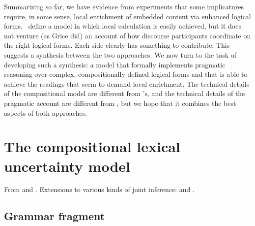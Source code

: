 \documentclass{article}
\begin{document}
Summarizing so far, we have evidence from
 experiments that some implicatures
require, in some sense, local enrichment of embedded content via
enhanced logical forms.  \CFS\ define a model in which local
calculation is easily achieved, but it does not venture (as Grice did)
an account of how discourse participants coordinate on the right
logical forms. Each side clearly has something to contribute.  This
suggests a synthesis between the two approaches. We now turn to the
task of developing such a synthesis: a model that formally implements
pragmatic reasoning over complex, compositionally defined logical
forms and that is able to achieve the readings that seem to demand
local enrichment. The technical details of the compositional model are
different from \CFS's, and the technical details of the pragmatic
account are different from \citeauthor{Grice75}, but we hope that it
combines the best aspects of both approaches.


\section{The compositional lexical uncertainty model}\label{sec:model}

From \citet{Bergen:Goodman:Levy:2012} and
\citet{Bergen:Levy:Goodman:2014}. Extensions to various kinds of joint
inference: \citet{Smith:Goodman:Frank:2013} and \citet{Kao-etal:2014}.


\subsection{Grammar fragment}
\end{document}
